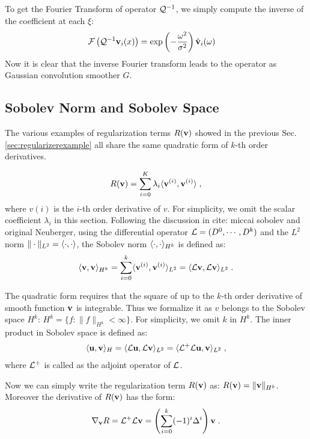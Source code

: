 \documentclass[letterpaper,12pt]{article}
\begin{document}
To get the Fourier Transform of operator $\mathcal{Q}^{-1}$, we simply compute the inverse of the coefficient at each $\xi$:
\begin{equation}
\begin{split}
\mathcal{F}\left( \mathcal{Q}^{-1} \mathbf{v}_i(x) \right) 
& =
\exp \left(
- \frac{\omega^2}{\sigma^2}
\right) \hat{\mathbf{v}}_i(\omega)
\end{split}
\end{equation}
Now it is clear that the inverse Fourier transform leads to the operator as Gaussian convolution smoother $G$.

\subsection{Sobolev Norm and Sobolev Space}

The various examples of regularization terms $R(\mathbf{v})$ showed in the previous Sec. \ref{sec:regularizerexample} all share the same quadratic form of $k$-th order derivatives. 

\begin{align}
R(\mathbf{v}) = \sum_{i=0}^K \lambda_i \langle \mathbf{v}^{(i)}, \mathbf{v}^{(i)} \rangle \;,
\end{align}
where $v{(i)}$ is the $i$-th order derivative of $v$. For simplicity, we omit the scalar coefficient $\lambda_i$ in this section. Following the discussion in \cite{Zikic2010} {cite: miccai sobolev and original Neuberger}, using the differential operator $\mathcal{L} = (D^0, \cdots, D^k)$ and the $L^2$ norm $\| \cdot \|_{L^2} = \langle \cdot, \cdot \rangle$, the Sobolev norm $\langle \cdot, \cdot \rangle_{H^k}$ is defined as: 
\begin{align}
\langle \mathbf{v}, \mathbf{v} \rangle_{H^k} = \sum_{i=0}^k \langle \mathbf{v}^{(i)}, \mathbf{v}^{(i)} \rangle_{L^2} = \langle \mathcal{L} \mathbf{v}, \mathcal{L} \mathbf{v} \rangle_{L^2} \;.
\end{align}

The quadratic form requires that the square of up to the $k$-th order derivative of smooth function $\mathbf{v}$ is integrable. Thus we formalize it as $v$ belongs to the Sobolev space $H^k$:  $H^k = \{ f : \| f \|_{H^k} < \infty \}$. For simplicity, we omit $k$ in $H^k$. The inner product in Sobolev space is defined as:
\begin{align}
\langle \mathbf{u}, \mathbf{v} \rangle_H = \langle \mathcal{L}\mathbf{u}, \mathcal{L}\mathbf{v} \rangle_{L^2} = \langle \mathcal{L}^+\mathcal{L} \mathbf{u}, \mathbf{v} \rangle_{L^2} \;,
\end{align}
where $\mathcal{L}^+$ is called as the adjoint operator of $\mathcal{L}$.

Now we can simply write the regularization term $R(\mathbf{v})$ as: $R(\mathbf{v}) = \| \mathbf{v} \|_{H^k}$. Moreover the derivative of $R(\mathbf{v})$ has the form:
\begin{align}
\nabla_{\mathbf{v}} R = \mathcal{L}^+\mathcal{L} \mathbf{v} = \left ( \sum_{i=0}^k (-1)^i \Delta^i \right ) \mathbf{v}\;.
\end{align}
\end{document}
